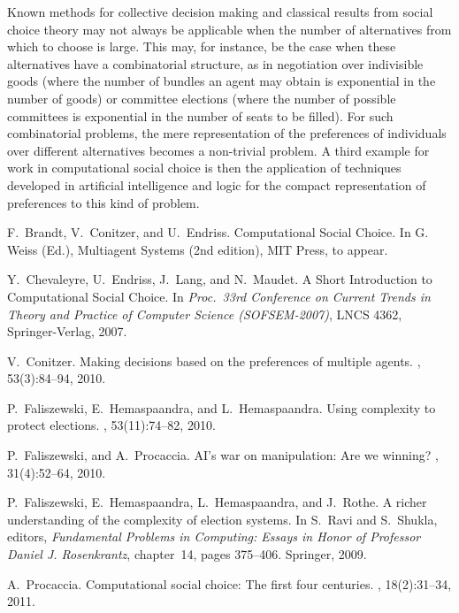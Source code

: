 \documentclass{comsoc2012}
\begin{document}
Known methods for collective decision making and classical results from 
social choice theory may not always be applicable when the number of 
alternatives from which to choose is large. This may, for instance, be 
the case when these alternatives have a combinatorial structure, as in 
negotiation over indivisible goods (where the number of bundles an agent 
may obtain is exponential in the number of goods) or committee elections 
(where the number of possible committees is exponential in the number 
of seats to be filled). For such combinatorial problems, the mere 
representation of the preferences of individuals over different 
alternatives becomes a non-trivial problem. A third example for work 
in computational social choice is then the application of techniques 
developed in artificial intelligence and logic for the compact 
representation of preferences to this kind of problem. 



\begin{thebibliography}{1}

F.~Brandt, V.~Conitzer, and U.~Endriss.
\newblock Computational Social Choice. 
\newblock In G. Weiss (Ed.), Multiagent Systems (2nd edition), MIT Press, to appear.


Y.~Chevaleyre, U.~Endriss, J.~Lang, and N.~Maudet. 
A Short Introduction to Computational Social Choice. 
In \emph{Proc.\ 33rd Conference on Current Trends in 
Theory and Practice of Computer Science (SOFSEM-2007)}, 
LNCS 4362, Springer-Verlag, 2007.


V.~Conitzer.
\newblock Making decisions based on the preferences of multiple agents.
, 53(3):84--94, 2010.


P.~Faliszewski, E.~Hemaspaandra, and L.~Hemaspaandra.
\newblock Using complexity to protect elections.
, 53(11):74--82, 2010.

P.~Faliszewski, and A.~Procaccia.
\newblock AI's war on manipulation: Are we winning?
, 31(4):52--64, 2010.


P.~Faliszewski, E.~Hemaspaandra, L.~Hemaspaandra, and J.~Rothe.
\newblock A richer understanding of the complexity of election systems.
\newblock In S.~Ravi and S.~Shukla, editors, {\em Fundamental Problems in
  Computing: {Essays} in Honor of {Professor} {Daniel} {J.} {Rosenkrantz}},
  chapter~14, pages 375--406. Springer, 2009.

A.~Procaccia.
\newblock Computational social choice: The first four centuries.
, 18(2):31--34, 2011.



\end{thebibliography}
\end{document}
